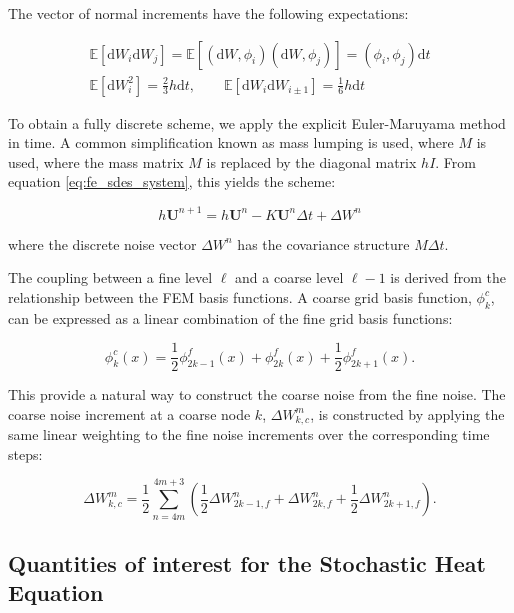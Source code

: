 The vector of normal increments have the following expectations:

\begin{align*}
    \mathbb{E}[\mathrm{d}W_i \mathrm{d}W_j] = \mathbb{E}[(\mathrm{d}W, \phi_i) 
    (\mathrm{d}W, \phi_j)] = (\phi_i, \phi_j)\mathrm{d}t\\
    \mathbb{E}[\mathrm{d}W_i^2] = \frac{2}{3}h \mathrm{d}t, \qquad 
    \mathbb{E}[\mathrm{d}W_i \mathrm{d}W_{i\pm 1}] = \frac{1}{6} h \mathrm{d}t
\end{align*}

To obtain a fully discrete scheme, we apply the explicit Euler-Maruyama
method in time. A common simplification known as mass lumping is used, where $M$
is used, where the mass matrix $M$ is replaced by the diagonal matrix $hI$. 
From equation \eqref{eq:fe_sdes_system}, this yields the scheme:

\begin{equation}
    h\mathbf{U}^{n+1} = h\mathbf{U}^n - K \mathbf{U}^n \Delta t + \Delta W^n
\end{equation}

where the discrete noise vector $\Delta W^n$ has the covariance structure 
$M \Delta t$.

The coupling between a fine level $\ell$ and a coarse level $\ell-1$ is derived 
from the relationship between the FEM basis functions. A coarse grid basis 
function, $\phi_k^c$, can be expressed as a linear combination of the fine grid basis functions:

\begin{equation*}
    \phi_k^c(x) = \frac{1}{2} \phi_{2k-1}^f(x) + \phi_{2k}^f(x) + \frac{1}{2}\phi_{2k+1}^f(x).
\end{equation*}

This provide a natural way to construct the coarse noise from the fine noise. The coarse
noise increment at a coarse node $k$, $\Delta W_{k,c}^m$, is constructed by applying the same 
linear weighting to the fine noise increments over the corresponding time steps: 

\begin{equation*}
    \Delta W_{k,c}^m = \frac{1}{2} \sum_{n=4m}^{4m+3} \left( 
        \frac{1}{2}\Delta W_{2k-1,f}^n + \Delta W_{2k,f}^n + 
        \frac{1}{2}\Delta W_{2k+1,f}^n \right).
\end{equation*}


\subsection{Quantities of interest for the Stochastic Heat Equation}

